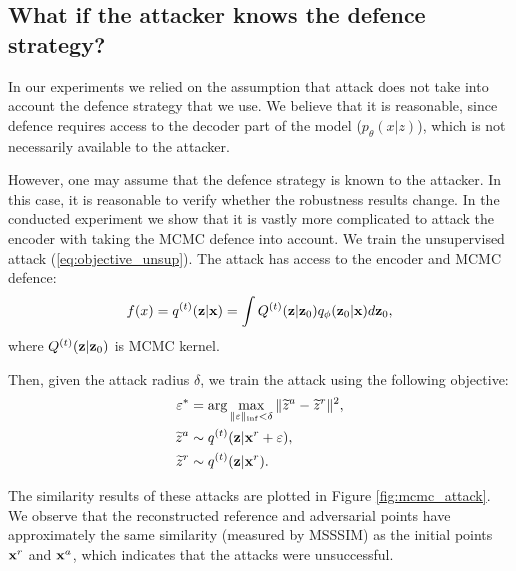 \newpage

\subsection{What if the attacker knows the defence strategy?} \label{appendix:attack_mcmc}
In our experiments we relied on the assumption that attack does not take into account the defence strategy that we use. We believe that it is reasonable, since defence requires access to the decoder part of the model ($p_{\theta}(x|z)$), which is not necessarily available to the attacker. 

However, one may assume that the defence strategy is known to the attacker. In this case, it is reasonable to verify whether the robustness results change. In the conducted experiment we show that it is vastly more complicated to attack the encoder with taking the MCMC defence into account. We train the unsupervised attack (\ref{eq:objective_unsup}). The attack has access to the encoder and MCMC defence:
\begin{equation}
f(x) = q^{(t)}({\mathbf{z}}|{\mathbf{x}}) = \int Q^{(t)}({\mathbf{z}}|{\mathbf{z}}_0) q_{\phi}({\mathbf{z}}_0|{\mathbf{x}}) d{\mathbf{z}}_0,
\end{equation}
where $Q^{(t)}({\mathbf{z}}|{\mathbf{z}}_0)$ is MCMC kernel. 

Then, given the attack radius $\delta$, we train the attack using the following objective:
\begin{align}
    \varepsilon^* &= \arg\max_{\|\varepsilon\|_{\inf} < \delta}\|\widetilde{z}^a - \widetilde{z}^r\|^2, \\
    \widetilde{z}^a &\sim q^{(t)}(\rvz|\rvx^r + \varepsilon), \label{eq:z_a_mcmc}\\
    \widetilde{z}^r &\sim q^{(t)}(\rvz|\rvx^r). \label{eq:z_r_mcmc}
\end{align}

The similarity results of these attacks are plotted in Figure \ref{fig:mcmc_attack}. We observe that the reconstructed reference and adversarial points have approximately the same similarity (measured by MSSSIM) as the initial points ${\mathbf{x}}^r$ and ${\mathbf{x}}^a$, which indicates that the attacks were unsuccessful. 


